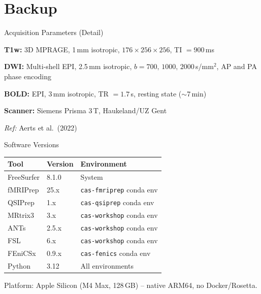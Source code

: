 
\section{Backup}

\begin{frame}{Acquisition Parameters (Detail)}

  \small

  \textbf{T1w:} 3D MPRAGE, 1\,mm isotropic,
  $176 \times 256 \times 256$, TI $= 900$\,ms

  \bigskip

  \textbf{DWI:} Multi-shell EPI, 2.5\,mm isotropic,
  $b = 700,\, 1000,\, 2000$\,s/mm$^2$,
  AP and PA phase encoding

  \bigskip

  \textbf{BOLD:} EPI, 3\,mm isotropic,
  TR $= 1.7$\,s, resting state ($\sim$7\,min)

  \bigskip

  \textbf{Scanner:} Siemens Prisma 3\,T, Haukeland/UZ Gent

  \bigskip

  \textit{Ref:} Aerts et al.\ (2022) \cite{Aerts2022}

\end{frame}

\begin{frame}{Software Versions}

  \begin{tabular}{lll}
    \toprule
    \textbf{Tool} & \textbf{Version} & \textbf{Environment} \\
    \midrule
    FreeSurfer & 8.1.0 & System \\
    fMRIPrep & 25.x & \texttt{cas-fmriprep} conda env \\
    QSIPrep & 1.x & \texttt{cas-qsiprep} conda env \\
    MRtrix3 & 3.x & \texttt{cas-workshop} conda env \\
    ANTs & 2.5.x & \texttt{cas-workshop} conda env \\
    FSL & 6.x & \texttt{cas-workshop} conda env \\
    FEniCSx & 0.9.x & \texttt{cas-fenics} conda env \\
    Python & 3.12 & All environments \\
    \bottomrule
  \end{tabular}

  \bigskip

  Platform: Apple Silicon (M4 Max, 128\,GB) -- native ARM64,
  no Docker/Rosetta.

\end{frame}

